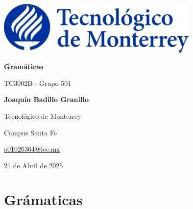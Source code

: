 \documentclass[a4paper, twoside, 12pt]{article}
\begin{document}
\begin{titlepage}
\begin{center}
		\includegraphics[width=0.75\textwidth]{Img/logo.png}
		
		\vspace{20pt}
		
		\begin{LARGE}\bf{Gramáticas}
		\end{LARGE}
		
		\vspace{50pt}

		TC3002B - Grupo 501
		
		\vspace{80pt}
        
        \textbf{Joaquín Badillo Granillo}
        
        Tecnológico de Monterrey
        
        Campus Santa Fe
        
        \href{mailto:a01026364@tec.mx}{a01026364@tec.mx}            
		
        \vspace{120pt}     
    				
		21 de Abril de 2025
	\end{center}
\end{titlepage}
\pagebreak
\section*{Grámaticas}
\end{document}
